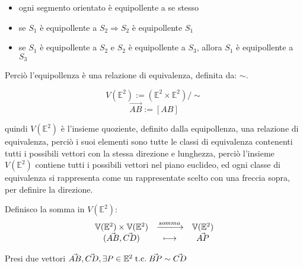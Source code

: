 \documentclass[a4paper,12pt]{article}
\begin{document}
	\begin{itemize}
		\item ogni segmento orientato è equipollente a se stesso
		\item se $S_1$ è equipollente a $S_2 \Rightarrow S_2$ è equipollente $S_1$
		\item se $S_1$ è equipollente a $S_2$ e $S_2$ è equipollente a $S_3$, allora $S_1$ è equipollente a $S_3$
	\end{itemize}
	Perciò l'equipollenza è una relazione di equivalenza, definita da: $\sim$.
	
	\[V(\mathbb{E}^2) := (\mathbb{E}^2 \times \mathbb{E}^2)/\sim\]
	\[\vec{AB} := [AB]\]
	
	quindi $V(\mathbb{E}^2)$ è l'insieme quoziente, definito dalla equipollenza, una relazione di equivalenza, perciò i suoi elementi sono tutte le classi di equivalenza contenenti tutti i possibili vettori con la stessa direzione e lunghezza, perciò l'insieme $V(\mathbb{E}^2)$ contiene tutti i possibili vettori nel piano euclideo, ed ogni classe di equivalenza si rappresenta come un rappresentate scelto con una freccia sopra, per definire la direzione.
	
	Definisco la somma in $V(\mathbb{E}^2)$:
	\[
	\begin{array}{c c c}
		\mathbb{V}(\mathbb{E}^2) \times \mathbb{V}(\mathbb{E}^2) & \xlongrightarrow{somma} & \mathbb{V}(\mathbb{E}^2) \\
		(\vec{AB}, \vec{CD}) & \longmapsto & \vec{AP} \\
	\end{array}
	\]	
	
	Presi due vettori $\vec{AB}, \vec{CD}, \exists P \in \mathbb{E}^2 \;\text{t.c.}\; \vec{BP} \sim \vec{CD}$
	
\end{document}
